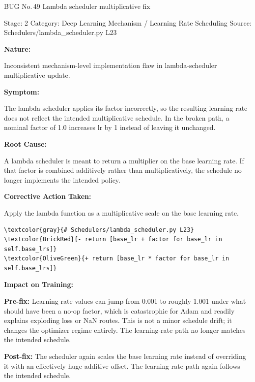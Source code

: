 \documentclass[10pt]{article}
\newcommand{\FieldLabel}[1]{%
 {\bfseries #1:}\par
}
\begin{document}
\begin{bugbox}{BUG No.\,49 \quad Lambda scheduler multiplicative fix}
{\color{MetaGray}\small Stage: 2 \;\textbar\; Category: Deep Learning Mechanism / Learning Rate Scheduling \;\textbar\; Source: Schedulers/lambda\_scheduler.py L23\par}
\vspace{0.22em}
\FieldLabel{Nature}
Inconsistent mechanism-level implementation flaw in lambda-scheduler multiplicative update.
\par
\vspace{0.35em}
\FieldLabel{Symptom}
The lambda scheduler applies its factor incorrectly, so the resulting learning rate does not reflect the intended multiplicative schedule. In the broken path, a nominal factor of 1.0 increases lr by 1 instead of leaving it unchanged.
\par
\vspace{0.35em}
\FieldLabel{Root Cause}
A lambda scheduler is meant to return a multiplier on the base learning rate. If that factor is combined additively rather than multiplicatively, the schedule no longer implements the intended policy.
\par
\vspace{0.35em}
\FieldLabel{Corrective Action Taken}
Apply the lambda function as a multiplicative scale on the base learning rate.
\par
\vspace{0.35em}
\begin{Verbatim}[commandchars=\\\{\},fontsize=\footnotesize,breaklines=true,breaksymbol={},frame=leftline,framerule=2pt,rulecolor=\color{gray!40},xleftmargin=6pt,formatcom=\singlespacing]
\textcolor{gray}{# Schedulers/lambda_scheduler.py L23}
\textcolor{BrickRed}{- return [base_lr + factor for base_lr in self.base_lrs]}
\textcolor{OliveGreen}{+ return [base_lr * factor for base_lr in self.base_lrs]}
\end{Verbatim}
\vspace{0.22em}
\FieldLabel{Impact on Training}
\textbf{Pre-fix:} Learning-rate values can jump from 0.001 to roughly 1.001 under what should have been a no-op factor, which is catastrophic for Adam and readily explains exploding loss or NaN routes. This is not a minor schedule drift; it changes the optimizer regime entirely. The learning-rate path no longer matches the intended schedule. \par\smallskip
\textbf{Post-fix:} The scheduler again scales the base learning rate instead of overriding it with an effectively huge additive offset. The learning-rate path again follows the intended schedule. 
\par
\vspace{0.35em}
\end{bugbox}
\end{document}
